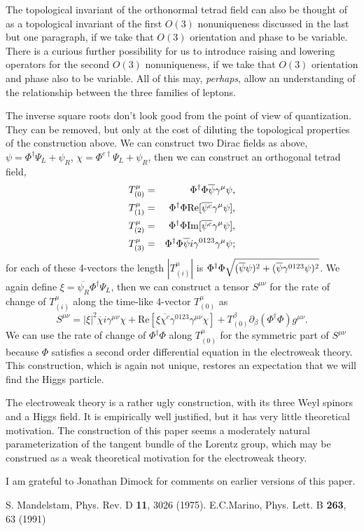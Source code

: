 \documentclass[a4paper,twocolumn,showpacs,preprintnumbers,aps]{revtex4}
\begin{document}
The topological invariant of the orthonormal tetrad field can also be thought of as a
topological invariant of the first $O(3)$ nonuniqueness discussed in the last but one
paragraph, if we take that $O(3)$ orientation and phase to be variable. There is a
curious further possibility for us to introduce raising and lowering operators for the
second $O(3)$ nonuniqueness, if we take that $O(3)$ orientation and phase also
to be variable. All of this may, \emph{perhaps}, allow an understanding of the
relationship between the three families of leptons.

The inverse square roots don't look good from the point of view of quantization. They
can be removed, but only at the cost of diluting the topological properties of the
construction above. We can construct two Dirac fields as above,
$\psi=\Phi^\dagger\Psi_L+\psi_R$, $\chi=\Phi^{c\dagger}\Psi_L+\psi_R$,
then we can construct an orthogonal tetrad field,
\begin{eqnarray*}
    T^\mu_{(0)}&=&\Phi^\dagger\Phi\overline{\psi}\gamma^\mu\psi,\cr
    T^\mu_{(1)}&=&\Phi^\dagger\Phi\mathrm{Re}[\overline{\psi^c}\gamma^\mu\psi],\cr
    T^\mu_{(2)}&=&\Phi^\dagger\Phi\mathrm{Im}[\overline{\psi^c}\gamma^\mu\psi],\cr
    T^\mu_{(3)}&=&\Phi^\dagger\Phi\overline{\psi}i\gamma^{0123}\gamma^\mu\psi;
\end{eqnarray*}
for each of these 4-vectors the length $\left |T^\mu_{(i)}\right|$ is $\Phi^\dagger\Phi{\sqrt{(\overline{\psi}\psi)^2+(\overline{\psi}\gamma^{0123}\psi)^2}}$.
We again define $\xi=\overline{\psi_R}\Phi^\dagger\Psi_L$, then we can construct a
tensor $S^{\mu\nu}$ for the rate of change of $T^\mu_{(i)}$ along the time-like 4-vector
$T^\mu_{(0)}$ as
$$S^{\mu\nu}= |\xi|^2\overline{\chi}i\gamma^{\mu\nu}\chi+
                \mathrm{Re}[\xi\overline{\chi^c}\gamma^{0123}\gamma^{\mu\nu}\chi] +
                    T^\beta_{(0)}\partial_\beta(\Phi^\dagger\Phi) g^{\mu\nu}.$$
We can use the rate of change of $\Phi^\dagger\Phi$ along $T^\mu_{(0)}$ for the
symmetric part of $S^{\mu\nu}$ because $\Phi$ satisfies a second order differential
equation in the electroweak theory. This construction, which is again not unique, restores
an expectation that we will find the Higgs particle.

The electroweak theory is a rather ugly construction, with its three Weyl spinors
and a Higgs field. It is empirically well justified, but it has very little theoretical
motivation. The construction of this paper seems a moderately natural
parameterization of the tangent bundle of the Lorentz group, which may
be construed as a weak theoretical motivation for the electroweak theory.

I am grateful to Jonathan Dimock for comments on earlier versions of this paper.

\begin{thebibliography}{Mandelstam}
  {S. Mandelstam, Phys. Rev. D \textbf{11}, 3026 (1975).}
  {E.C.Marino, Phys. Lett. B \textbf{263}, 63 (1991)}
\end{thebibliography}
\end{document}
